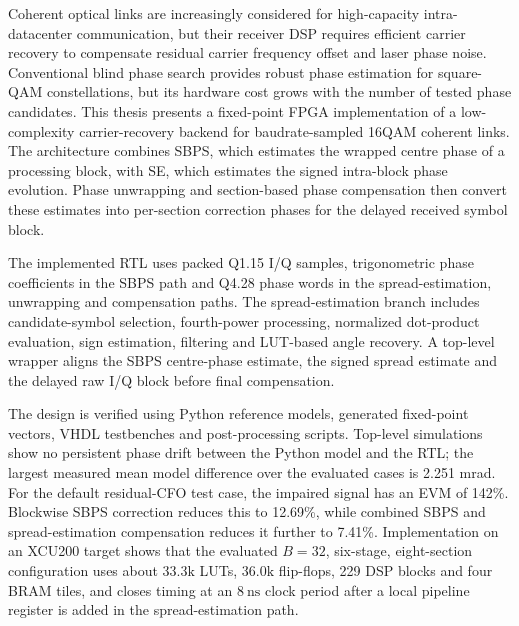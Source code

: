 Coherent optical links are increasingly considered for high-capacity intra-datacenter communication, but their receiver \ac{DSP} requires efficient carrier recovery to compensate residual carrier frequency offset and laser phase noise. Conventional blind phase search provides robust phase estimation for square-QAM constellations, but its hardware cost grows with the number of tested phase candidates. This thesis presents a fixed-point \ac{FPGA} implementation of a low-complexity carrier-recovery backend for baudrate-sampled \ac{16QAM} coherent links. The architecture combines \ac{SBPS}, which estimates the wrapped centre phase of a processing block, with \ac{SE}, which estimates the signed intra-block phase evolution. Phase unwrapping and section-based phase compensation then convert these estimates into per-section correction phases for the delayed received symbol block.

The implemented \ac{RTL} uses packed Q1.15 I/Q samples, 
trigonometric phase coefficients in the \ac{SBPS} path and 
Q4.28 phase words in the spread-estimation, unwrapping and compensation paths. 
The spread-estimation branch includes candidate-symbol selection, fourth-power processing, 
normalized dot-product evaluation, sign estimation, filtering and \ac{LUT}-based angle recovery. 
A top-level wrapper aligns the \ac{SBPS} centre-phase estimate, the signed spread estimate and the delayed 
raw I/Q block before final compensation.

The design is verified using Python reference models, generated fixed-point vectors, \ac{VHDL} testbenches and post-processing scripts. Top-level simulations show no persistent phase drift between the Python model and the \ac{RTL}; the largest measured mean model difference over the evaluated cases is 2.251 mrad. For the default residual-\ac{CFO} test case, the impaired signal has an \ac{EVM} of 142\%. Blockwise \ac{SBPS} correction reduces this to 12.69\%, while combined \ac{SBPS} and spread-estimation compensation reduces it further to 7.41\%. Implementation on an XCU200 target shows that the evaluated \(B=32\), six-stage, eight-section configuration uses about \(33.3\mathrm{k}\) LUTs, \(36.0\mathrm{k}\) flip-flops, 229 DSP blocks and four BRAM tiles, and closes timing at an \(8~\mathrm{ns}\) clock period after a local pipeline register is added in the spread-estimation path.
